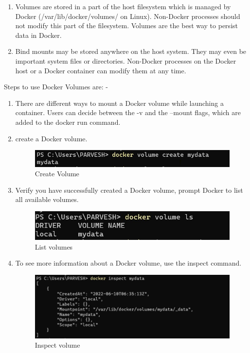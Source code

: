 \documentclass[12pt]{article}
\begin{document}
\begin{enumerate}
\item Volumes are stored in a part of the host filesystem which is managed by Docker (/var/lib/docker/volumes/ on Linux). Non-Docker processes should not modify this part of the filesystem. Volumes are the best way to persist data in Docker.

\item Bind mounts may be stored anywhere on the host system. They may even be important system files or directories. Non-Docker processes on the Docker host or a Docker container can modify them at any time.
\end{enumerate}


Steps to use Docker Volumes are: -

\begin{enumerate}
\item There are different ways to mount a Docker volume while launching a container. Users can decide between the -v and the --mount flags, which are added to the docker run command.

\item create a Docker volume.

\begin{figure}[H]
\centering
\includegraphics[scale=0.6]{fig43}
\caption{Create Volume}
\vspace{0.6\baselineskip}
\end{figure}

\item Verify you have successfully created a Docker volume, prompt Docker to list all available volumes.

\begin{figure}[H]
\centering
\includegraphics[scale=0.6]{fig44}
\caption{List volumes}
\vspace{0.6\baselineskip}
\end{figure}

\item To see more information about a Docker volume, use the inspect command.

\begin{figure}[H]
\centering
\includegraphics[scale=0.6]{fig45}
\caption{Inspect volume}
\vspace{0.6\baselineskip}
\end{figure}


\end{enumerate}
\end{document}
